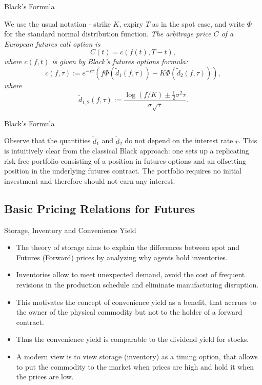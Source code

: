 {%
{Black's Formula}

We use the usual notation -
strike $K$, expiry $T$ as in the spot case, and write $\Phi$ for the
standard normal distribution function.
{\it
The arbitrage price $C$ of a European futures call option is
$$
C(t)= c(f(t), T-t),
$$
where $c(f,t)$ is given by Black's futures options formula:
$$
c(f,\tau) := e^{-r\tau} (f \Phi(\tilde{d}_1 (f,\tau)) - K \Phi(\tilde{d}_2 (f,\tau))),
$$
where
$$
\tilde{d}_{1,2} (f,\tau) := \frac{\log (f/K) \pm \frac{1}{2} {\sigma}^2 \tau}{
\sigma \sqrt{\tau}}.
$$
}



{Black's Formula}

Observe that the quantities $\tilde{d}_1$ and $\tilde{d}_2$ do not depend on the
interest rate $r$. This is intuitively clear from the classical
Black approach: one sets up a replicating risk-free portfolio
consisting of a position in futures options and an offsetting
position in the underlying futures contract. The portfolio
requires no initial investment and therefore should not earn any
interest.



\subsection{Basic Pricing Relations for Futures}

{Storage, Inventory and Convenience Yield}
\begin{itemize}
\item<1-> The theory of storage aims to explain the differences between spot
and Futures (Forward) prices by analyzing why agents hold inventories.
\item<2-> Inventories
allow to meet unexpected demand, avoid the cost of frequent revisions in
the production schedule and eliminate manufacturing disruption.
\item<3-> This
motivates the concept of convenience yield as a benefit, that accrues to the
owner of the physical commodity but not to the holder of a forward contract.
\item<4-> Thus the convenience yield is comparable to the dividend yield for stocks.
\item<5-> A modern view is to view storage (inventory) as a timing option, that
allows to put the commodity to the market when prices are high
and hold it when the prices are low.
\end{itemize}



}
